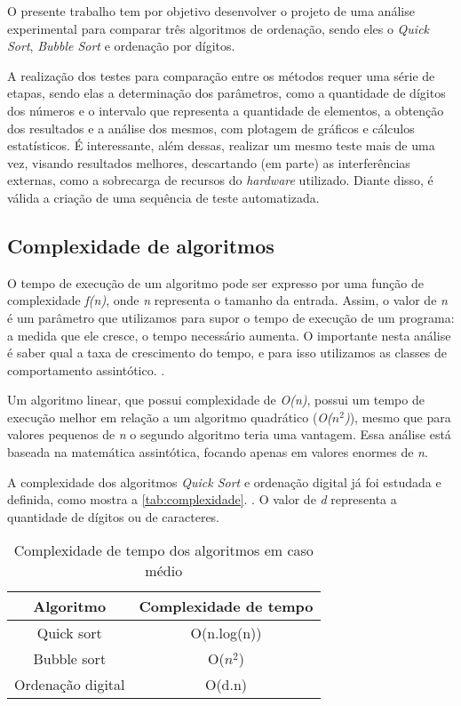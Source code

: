 \documentclass[12pt]{article}
\begin{document}
O presente trabalho tem por objetivo desenvolver o projeto de uma análise experimental para comparar três algoritmos de ordenação, sendo eles o \textit{Quick Sort}, \textit{Bubble Sort} e ordenação por dígitos.

A realização dos testes para comparação entre os métodos requer uma série de etapas, sendo elas a determinação dos parâmetros, como a quantidade de dígitos dos números e o intervalo que representa a quantidade de elementos, a obtenção dos resultados e a análise dos mesmos, com plotagem de gráficos e cálculos estatísticos. É interessante, além dessas, realizar um mesmo teste mais de uma vez, visando resultados melhores, descartando (em parte) as interferências externas, como a sobrecarga de recursos do \textit{hardware} utilizado. Diante disso, é válida a criação de uma sequência de teste automatizada.

\subsection{Complexidade de algoritmos}

O tempo de execução de um algoritmo pode ser expresso por uma função de complexidade \textit{f(n)}, onde \textit{n} representa o tamanho da entrada. Assim, o valor de \textit{n} é um parâmetro que utilizamos para supor o tempo de execução de um programa: a medida que ele cresce, o tempo necessário aumenta. O importante nesta análise é saber qual a taxa de crescimento do tempo, e para isso utilizamos as classes de comportamento assintótico. \cite{projeto:99}.

Um algoritmo linear, que possui complexidade de \textit{O(n)}, possui um tempo de execução melhor em relação a um algoritmo quadrático (\textit{O($n^2$)}), mesmo que para valores pequenos de \textit{n} o segundo algoritmo teria uma vantagem. Essa análise está baseada na matemática assintótica, focando apenas em valores enormes de \textit{n}.

A complexidade dos algoritmos \textit{Quick Sort} e ordenação digital já foi estudada e definida, como mostra a \autoref{tab:complexidade}. \cite{desmistificando:14}. O valor de \textit{d} representa a quantidade de dígitos ou de caracteres.

\begin{table}[!htbp]
	\centering
	\caption{Complexidade de tempo dos algoritmos em caso médio}
	\label{tab:complexidade}
	\begin{tabular}{c|c}
		Algoritmo & Complexidade de tempo \\
		\hline
		Quick sort & O(n.log(n)) \\
		Bubble sort & O($n^2$) \\
		Ordenação digital & O(d.n)
	\end{tabular}
\end{table}
\end{document}
